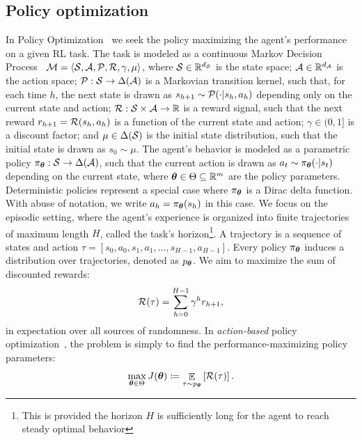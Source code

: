 \documentclass{article}
\begin{document}
\subsection{Policy optimization}
In Policy Optimization~\citep{deisenroth2013survey} we seek the policy maximizing the agent's performance on a given RL task. The task is modeled as a continuous Markov Decision Process~\citep[MDP,][]{puterman2014markov} $\mathcal{M} = \langle\mathcal{S},\mathcal{A},\mathcal{P},\mathcal{R},\gamma,\mu\rangle$, where $\mathcal{S}\in\mathbb{R}^{d_{\mathcal{S}}}$ is the state space; $\mathcal{A}\in\mathbb{R}^{d_{\mathcal{A}}}$ is the action space; $\mathcal{P}:\mathcal{S}\to\Delta(\mathcal{A})$ is a Markovian transition kernel, such that, for each time $h$, the next state is drawn as $s_{h+1}\sim\mathcal{P}(\cdot|s_h,a_h)$ depending only on the current state and action; $\mathcal{R}:\mathcal{S}\times\mathcal{A}\to\mathbb{R}$ is a reward signal, such that the next reward $r_{h+1} = \mathcal{R}(s_h,a_h)$ is a function of the current state and action; $\gamma\in(0,1]$ is a discount factor; and $\mu\in\Delta(\mathcal{S})$ is the initial state distribution, such that the initial state is drawn as $s_0\sim\mu$. The agent's behavior is modeled as a parametric policy $\pi_{\boldsymbol{\theta}}:\mathcal{S}\to\Delta(\mathcal{A})$, such that the current action is drawn as $a_t\sim\pi_{\boldsymbol{\theta}}(\cdot|s_t)$ depending on the current state, where $\boldsymbol{\theta}\in\Theta\subseteq\mathbb{R}^m$ are the policy parameters. Deterministic policies represent a special case where $\pi_{\boldsymbol{\theta}}$ is a Dirac delta function. With abuse of notation, we write $a_h=\pi_{\boldsymbol{\theta}}(s_h)$ in this case. We focus on the episodic setting, where the agent's experience is organized into finite trajectories of maximum length $H$, called the task's horizon\footnote{This is \wlg provided the horizon $H$ is sufficiently long for the agent to reach steady optimal behavior}. A trajectory is a sequence of states and action $\tau=[s_0,a_0,s_1,a_1,\dots,s_{H-1},a_{H-1}]$. Every policy $\pi_{\boldsymbol{\theta}}$ induces a distribution over trajectories, denoted as $p_{\boldsymbol{\theta}}$. We aim to maximize the sum of discounted rewards:
\begin{align}\label{eq:Rtau}
	\mathcal{R}(\tau) = \sum_{h=0}^{H-1}\gamma^hr_{h+1},
\end{align}
in expectation over all sources of randomness.
In \textit{action-based} policy optimization~\citep{peters2008reinforcement}, the problem is simply to find the performance-maximizing policy parameters:
\begin{align}\label{eq:Jtheta}
	\max_{\boldsymbol{\theta}\in\Theta} J(\boldsymbol{\theta}) \coloneqq \mathop{\mathbb{E}}_{\tau\sim p_{\boldsymbol{\theta}}}\left[\mathcal{R}(\tau)\right].
\end{align}
\end{document}
